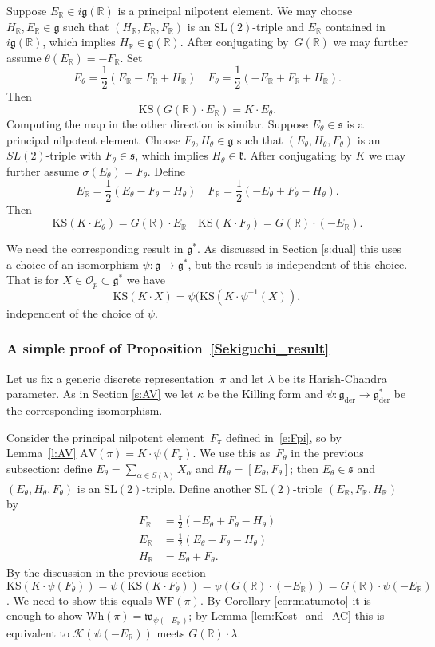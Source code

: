 \documentclass[10pt,leqno]{article}
\numberwithin{equation}{section}
\renewcommand{\O}{\mathcal O}
\newcommand{\R}{\mathbb R}
\newcommand{\K}{\mathcal K}
\renewcommand{\k}{\mathfrak k}
\newcommand{\g}{\mathfrak g}
\newcommand{\gder}{\mathfrak g_{\mathrm{der}}}
\newcommand\inv{^{-1}}
\newcommand{\s}{\mathfrak s}
\newcommand{\w}{\mathfrak w}
\newcommand{\AV}{\mathrm{AV}}
\newcommand{\KS}{\mathrm{KS}}
\newcommand{\Wh}{\mathrm{Wh}}
\newcommand{\WF}{\mathrm{WF}}
\begin{document}
Suppose $E_\R\in i\g(\R)$ is a principal nilpotent element.
We may choose $H_\R, E_\R \in \g$ such that $(H_\R,E_\R,F_\R)$ is an $\mathrm{SL}(2)$-triple and  $E_\R$  contained in $i\g(\R)$,
which implies $H_\R\in \g(\R)$. 
After conjugating by~$G(\R)$ we may further assume $\theta(E_\R)=-F_\R$. Set 
\[   E_\theta=\frac12(E_\R-F_\R+H_\R)\quad
F_\theta=\frac12(-E_\R+F_\R+H_\R).
\]
Then
$$
\KS(G(\R)\cdot E_\R)=K\cdot E_\theta.
$$
Computing the map in the other direction is similar. Suppose $E_\theta\in \s$ is a principal nilpotent element. 
Choose $F_\theta, H_\theta \in \g$ such that $(E_\theta, H_\theta, F_\theta)$ is an $SL(2)$-triple with $F_\theta \in \s$,  which implies $H_\theta\in\k$. After conjugating by $K$ we may further assume $\sigma(E_\theta)=F_\theta$.
Define 
\begin{equation}\label{def_F_R}
E_\R=\frac12(E_\theta-F_\theta-H_\theta)\quad
F_\R=\frac12(-E_\theta+F_\theta-H_\theta).
\end{equation}
Then
\begin{equation}
\label{e:KS}
\KS(K\cdot E_\theta)=G(\R)\cdot E_\R\quad\KS(K\cdot F_\theta)=G(\R)\cdot(-E_\R).
\end{equation}

We need the corresponding result in $\g^*$. As discussed in Section \ref{s:dual} this uses a choice of an isomorphism $\psi\colon \g\to \g^*$, but the result is independent of this choice.
That is for $X\in \O_p\subset \g^*$ we have
$$
\KS(K\cdot X)=\psi(\KS(K\cdot \psi\inv(X)),
$$
independent of the choice of $\psi$.


\subsubsection{A simple proof of Proposition~\ref{Sekiguchi_result}}\label{sec:sekiguchi_proof}

Let us fix a generic discrete representation~$\pi$ and let $\lambda$ be its Harish-Chandra parameter.
As in Section \ref{s:AV} we let $\kappa$ be the Killing form and $\psi\colon\gder\to \gder^*$ be the corresponding isomorphism.

Consider the principal nilpotent element~$F_\pi$ defined in~\eqref{e:Fpi}, so by Lemma~\ref{l:AV} $\AV(\pi)=K\cdot \psi(F_\pi)$. 
We use this as~$F_\theta$ in the previous subsection: define $E_\theta = \sum_{\alpha \in S(\lambda)}X_\alpha$ and $H_\theta  = [E_\theta, F_\theta]$; then $E_\theta \in \s$ and $(E_\theta, H_\theta, F_\theta)$ is an $\mathrm{SL}(2)$-triple. Define another $\mathrm{SL}(2)$-triple $(E_\R, F_\R, H_\R)$ by
\[ \begin{aligned}
  F_\R&=\frac12(-E_\theta+F_\theta-H_\theta)\\
  E_\R&=\frac12(E_\theta-F_\theta-H_\theta)\\
  H_\R&=E_\theta+F_\theta.
\end{aligned}\]
By the discussion in the previous section $\KS(K\cdot \psi(F_\theta))=\psi(\KS(K\cdot F_\theta))=\psi(G(\R)\cdot (-E_\R))=G(\R)\cdot \psi(-E_\R)$.
We need to show this equals $\WF(\pi)$. By Corollary \ref{cor:matumoto} it is enough to show $\Wh(\pi)=\w_{\psi(-E_
  \R)}$; by 
   Lemma \ref{lem:Kost_and_AC} this is equivalent to $\K(\psi(-E_\R))$ meets $G(\R)\cdot\lambda$. 
\end{document}
